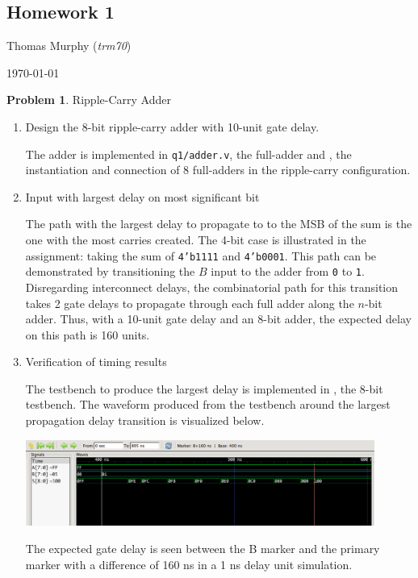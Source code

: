 \documentclass[10pt]{article}
\theoremstyle{definition}
\newtheorem{problem}{Problem}
\begin{document}
  \begin{center}
  \section*{Homework 1}
  \end{center}
  Thomas Murphy (\textit{trm70})

  \today

  \bigskip

  \begin{problem}
    Ripple-Carry Adder

    \begin{enumerate}
      \item Design the 8-bit ripple-carry adder with 10-unit gate delay.

      The adder is implemented in \texttt{q1/adder.v}, the full-adder and \texttt{}, the instantiation and connection of 8 full-adders in the ripple-carry configuration.

      \item Input with largest delay on most significant bit

      The path with the largest delay to propagate to to the MSB of the sum is the one with the most carries created. The 4-bit case is illustrated in the assignment: taking the sum of \texttt{4'b1111} and \texttt{4'b0001}. This path can be demonstrated by transitioning the $B$ input to the adder from \texttt{0} to \texttt{1}. Disregarding interconnect delays, the combinatorial path for this transition takes 2 gate delays to propagate through each full adder along the $n$-bit adder. Thus, with a 10-unit gate delay and an 8-bit adder, the expected delay on this path is 160 units.

      \item Verification of timing results

      The testbench to produce the largest delay is implemented in \texttt{}, the 8-bit testbench. The waveform produced from the testbench around the largest propagation delay transition is visualized below.

      \includegraphics*[width=0.9\textwidth] {adder_rc_8_propagation-screenshot.png}

      The expected gate delay is seen between the B marker and the primary marker with a difference of 160 ns in a 1 ns delay unit simulation.

    \end{enumerate}
  \end{problem}
\end{document}
